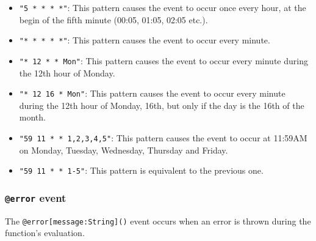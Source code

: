 \documentclass[11pt]{article}
\begin{document}
\begin{itemize}
\item \texttt{"5 * * * *"}: This pattern causes the event to occur once every hour, at the begin of the fifth minute (00:05, 01:05, 02:05 etc.).
\item \texttt{"* * * * *"}: This pattern causes the event to occur every minute.
\item \texttt{"* 12 * * Mon"}: This pattern causes the event to occur every minute during the 12th hour of Monday.
\item \texttt{"* 12 16 * Mon"}: This pattern causes the event to occur every minute during the 12th hour of Monday, 16th, but only if the day is the 16th of the month.
\item \texttt{"59 11 * * 1,2,3,4,5"}: This pattern causes the event to occur at 11:59AM on Monday, Tuesday, Wednesday, Thursday and Friday.
\item \texttt{"59 11 * * 1-5"}: This pattern is equivalent to the previous one.
\end{itemize}

\subsubsection{\texttt{@error} event}

The \texttt{@error[message:String]()} event occurs when an error is thrown during the function's evaluation.
\end{document}
